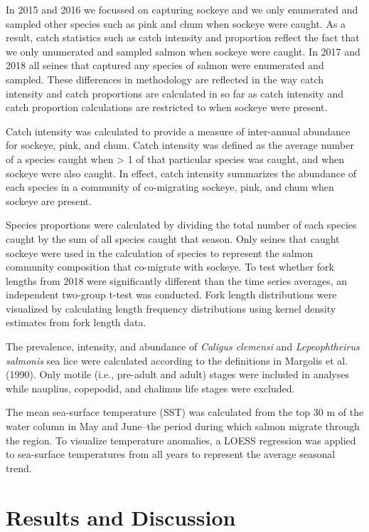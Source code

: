 \documentclass[fleqn,10pt]{wlpeerj} %
\begin{document}
In 2015 and 2016 we focussed on capturing sockeye and we only enumerated and sampled other species such as pink and chum when sockeye were caught. As a result, catch statistics such as catch intensity and proportion reflect the fact that we only unumerated and sampled salmon when sockeye were caught. In 2017 and 2018 all seines that captured any species of salmon were enumerated and sampled. These differences in methodology are reflected in the way catch intensity and catch proportions are calculated in so far as catch intensity and catch proportion calculations are restricted to when sockeye were present.

Catch intensity was calculated to provide a measure of inter-annual abundance for sockeye, pink, and chum. Catch intensity was defined as the average number of a species caught when \textgreater{} 1 of that particular species was caught, and when sockeye were also caught. In effect, catch intensity summarizes the abundance of each species in a community of co-migrating sockeye, pink, and chum when sockeye are present.

Species proportions were calculated by dividing the total number of each species caught by the sum of all species caught that season. Only seines that caught sockeye were used in the calculation of species to represent the salmon community composition that co-migrate with sockeye. To test whether fork lengths from 2018 were significantly different than the time series averages, an independent two-group t-test was conducted. Fork length distributions were visualized by calculating length frequency distributions using kernel density estimates from fork length data.

The prevalence, intensity, and abundance of \emph{Caligus clemensi} and \emph{Lepeophtheirus salmonis} sea lice were calculated according to the definitions in Margolis et al. (1990). Only motile (i.e., pre-adult and adult) stages were included in analyses while nauplius, copepodid, and chalimus life stages were excluded.

The mean sea-surface temperature (SST) was calculated from the top 30 m of the water column in May and June--the period during which salmon migrate through the region. To visualize temperature anomalies, a LOESS regression was applied to sea-surface temperatures from all years to represent the average seasonal trend.

\hypertarget{results-and-discussion}{%
\section{Results and Discussion}\label{results-and-discussion}}
\end{document}
